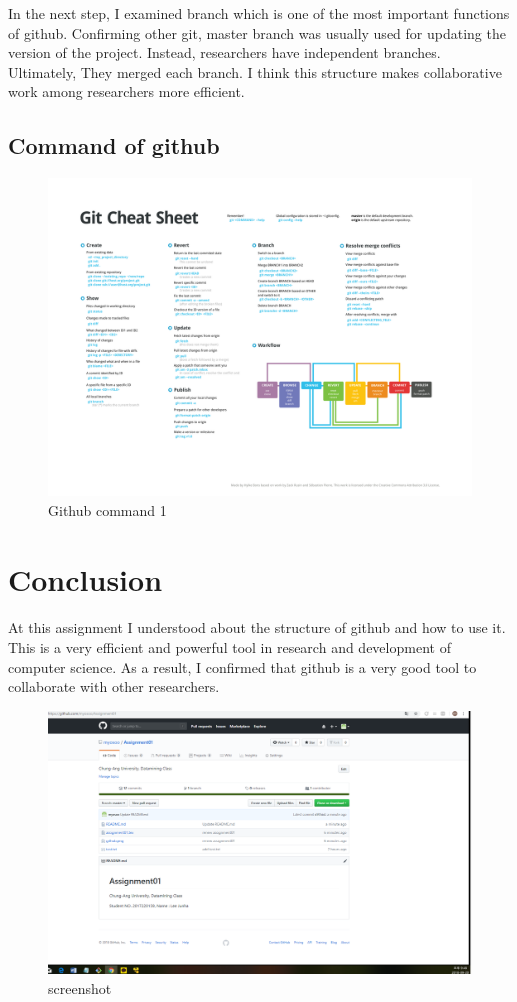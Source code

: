 \documentclass[12pt]{article}%
\begin{document}
In the next step, I examined branch which is one of the most important functions of github. Confirming other git, master branch was usually used for updating the version of the project. Instead, researchers have independent branches. Ultimately, They merged each branch. I think this structure makes collaborative work among researchers more efficient.

\subsection{Command of github}
\begin{figure}[h!]
\centering
\includegraphics[scale=0.24]{github}
\caption{Github command 1}
\label{fig:Github}
\end{figure}


\section{Conclusion}
\paragraph{}
At this assignment I understood about the structure of github and how to use it. This is a very efficient and powerful tool in research and development of computer science. As a result, I confirmed that github is a very good tool to collaborate with other researchers. 

\begin{figure}[h!]
\centering
\includegraphics[scale=0.35]{screenshot}
\caption{screenshot}
\label{fig:screenshot}
\end{figure}
\end{document}
